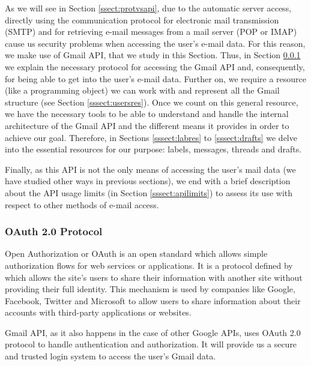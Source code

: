 As we will see in Section \ref{ssect:protvsapi}, due to the automatic server access, directly using the communication protocol for electronic mail transmission (SMTP) and for retrieving e-mail messages from a mail server (POP or IMAP) cause us security problems when accessing the user's e-mail data. For this reason, we make use of Gmail API, that we study in this Section. Thus, in Section \ref{sssect:oauth} we explain the necessary protocol for accessing the Gmail API and, consequently, for being able to get into the user's e-mail data. Further on, we require a resource (like a programming object) we can work with and represent all the Gmail structure (see Section \ref{sssect:usersres}). Once we count on this general resource, we have the necessary tools to be able to understand and handle the internal architecture of the Gmail API and the different means it provides in order to achieve our goal. Therefore, in Sections \ref{sssect:labres} to \ref{sssect:drafts} we delve into the essential resources for our purpose: labels, messages, threads and drafts.

Finally, as this API is not the only means of accessing the user's mail data (we have studied other ways in previous sections), we end with a brief description about the API usage limits (in Section \ref{sssect:apilimits}) to assess its use with respect to other methods of e-mail access.

\subsubsection{OAuth 2.0 Protocol}\label{sssect:oauth}
Open Authorization or OAuth \citep{oauth} is an open standard which allows simple authorization flows for web services or applications. It is a protocol defined by \cite{rfc6749} which allows the site's users to share their information with another site without providing their full identity. This mechanism is used by companies like Google, Facebook, Twitter and Microsoft to allow users to share information about their accounts with third-party applications or websites.

Gmail API, as it also happens in the case of other Google APIs, uses OAuth 2.0 protocol \citep{oauthforgoogle} to handle authentication and authorization. It will provide us a secure and trusted login system to access the user's Gmail data.

